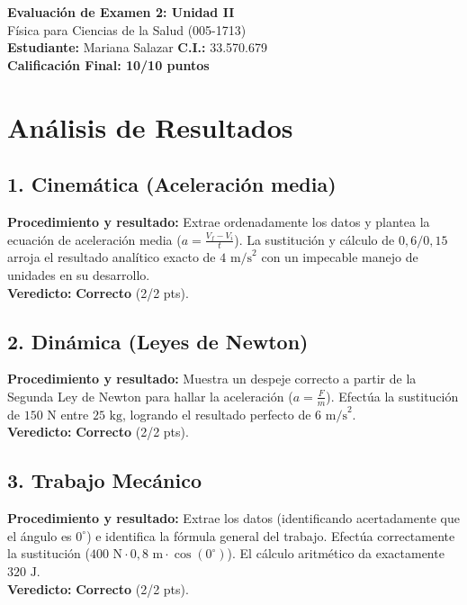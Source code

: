 \documentclass[12pt,letterpaper]{article}
\begin{document}
\begin{center}
    \Large \textbf{Evaluación de Examen 2: Unidad II} \\
    \large Física para Ciencias de la Salud (005-1713) \\
    \vspace{0.5cm}
    \textbf{Estudiante:} Mariana Salazar \quad \textbf{C.I.:} 33.570.679
    \vspace{0.3cm} \\
    \large \textbf{Calificación Final: 10/10 puntos}
\end{center}

\vspace{0.5cm}

\section*{Análisis de Resultados}

\subsection*{1. Cinemática (Aceleración media)}
\textbf{Procedimiento y resultado:} Extrae ordenadamente los datos y plantea la ecuación de aceleración media ($a = \frac{V_f - V_i}{t}$). La sustitución y cálculo de $0,6 / 0,15$ arroja el resultado analítico exacto de $4 \text{ m/s}^2$ con un impecable manejo de unidades en su desarrollo. \\
\textbf{Veredicto:} \textbf{Correcto} (2/2 pts).

\subsection*{2. Dinámica (Leyes de Newton)}
\textbf{Procedimiento y resultado:} Muestra un despeje correcto a partir de la Segunda Ley de Newton para hallar la aceleración ($a = \frac{F}{m}$). Efectúa la sustitución de $150 \text{ N}$ entre $25 \text{ kg}$, logrando el resultado perfecto de $6 \text{ m/s}^2$. \\
\textbf{Veredicto:} \textbf{Correcto} (2/2 pts).

\subsection*{3. Trabajo Mecánico}
\textbf{Procedimiento y resultado:} Extrae los datos (identificando acertadamente que el ángulo es $0^\circ$) e identifica la fórmula general del trabajo. Efectúa correctamente la sustitución ($400 \text{ N} \cdot 0,8 \text{ m} \cdot \cos(0^\circ)$). El cálculo aritmético da exactamente $320 \text{ J}$. \\
\textbf{Veredicto:} \textbf{Correcto} (2/2 pts).
\end{document}
